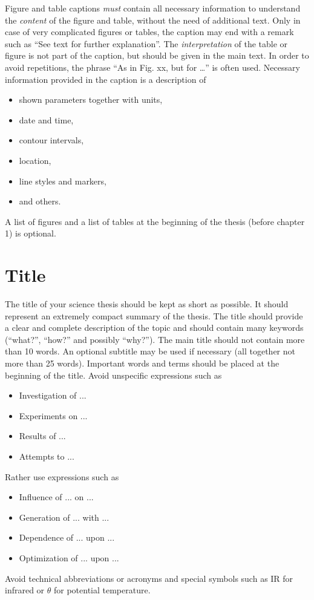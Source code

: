 Figure and table captions \emph{must} contain all necessary information to
understand the \emph{content} of the figure and table, without the need of
additional text. Only in case of very complicated figures or tables, the caption
may end with a remark such as ``See text for further explanation''. The
\emph{interpretation} of the table or figure is not part of the caption, but
should be given in the main text. In order to avoid repetitions, the phrase
``As in Fig. xx, but for \dots'' is often used. Necessary information provided
in the caption is a description of
\begin{itemize}
\item shown parameters together with units,
\item date and time,
\item contour intervals,
\item location,
\item line styles and markers,
\item and others.
\end{itemize}
A list of figures and a list of tables at the beginning of the thesis (before
chapter 1) is optional.



\section{Title}

The title of your science thesis should be kept as short as possible. It should
represent an extremely compact summary of the thesis. The title should provide a
clear and complete description of the topic and should contain many keywords
(``what?'', ``how?'' and possibly ``why?''). The main title should not contain
more than 10 words. An optional subtitle may be used if necessary (all together
not more than 25 words). Important words and terms should be placed at the
beginning of the title. Avoid unspecific expressions such as
\begin{itemize}
\item[] Investigation of ...
\item[] Experiments on ...
\item[] Results of ...
\item[] Attempts to ...
\end{itemize}
Rather use expressions such as
\begin{itemize}
\item[] Influence of ... on ...
\item[] Generation of ... with ...
\item[] Dependence of ... upon ...
\item[] Optimization of ... upon ...
\end{itemize}
Avoid technical abbreviations or acronyms and special symbols such as IR
for infrared or $\theta$ for potential temperature.


